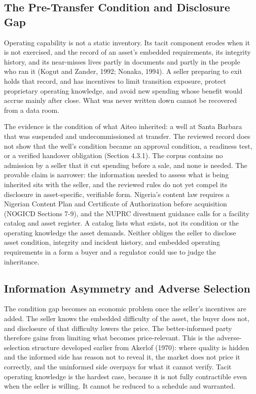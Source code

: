 \documentclass[twoside,fontset=lmodern]{mitthesis}
\begin{document}
\hypertarget{the-pre-transfer-condition-and-disclosure-gap}{%
\subsection{The Pre-Transfer Condition and Disclosure
Gap}\label{the-pre-transfer-condition-and-disclosure-gap}}

Operating capability is not a static inventory. Its tacit component
erodes when it is not exercised, and the record of an asset's embedded
requirements, its integrity history, and its near-misses lives partly in
documents and partly in the people who ran it (Kogut and Zander, 1992;
Nonaka, 1994). A seller preparing to exit holds that record, and has
incentives to limit transition exposure, protect proprietary operating
knowledge, and avoid new spending whose benefit would accrue mainly
after close. What was never written down cannot be recovered from a data
room.

The evidence is the condition of what Aiteo inherited: a well at Santa
Barbara that was suspended and undecommissioned at transfer. The
reviewed record does not show that the well's condition became an
approval condition, a readiness test, or a verified handover obligation
(Section 4.3.1). The corpus contains no admission by a seller that it
cut spending before a sale, and none is needed. The provable claim is
narrower: the information needed to assess what is being inherited sits
with the seller, and the reviewed rules do not yet compel its disclosure
in asset-specific, verifiable form. Nigeria's content law requires a
Nigerian Content Plan and Certificate of Authorization before
acquisition (NOGICD Sections 7-9), and the NUPRC divestment guidance
calls for a facility catalog and asset register. A catalog lists what
exists, not its condition or the operating knowledge the asset demands.
Neither obliges the seller to disclose asset condition, integrity and
incident history, and embedded operating requirements in a form a buyer
and a regulator could use to judge the inheritance.

\hypertarget{information-asymmetry-and-adverse-selection}{%
\subsection{Information Asymmetry and Adverse
Selection}\label{information-asymmetry-and-adverse-selection}}

The condition gap becomes an economic problem once the seller's
incentives are added. The seller knows the embedded difficulty of the
asset, the buyer does not, and disclosure of that difficulty lowers the
price. The better-informed party therefore gains from limiting what
becomes price-relevant. This is the adverse-selection structure
developed earlier from Akerlof (1970): where quality is hidden and the
informed side has reason not to reveal it, the market does not price it
correctly, and the uninformed side overpays for what it cannot verify.
Tacit operating knowledge is the hardest case, because it is not fully
contractible even when the seller is willing. It cannot be reduced to a
schedule and warranted.
\end{document}
